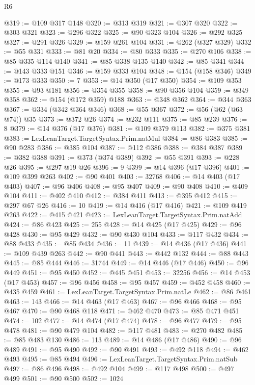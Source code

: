 \begin{lexlean}{R6}
\begin{coremodule}
@319 := @109 @317 @148
@320 := @313 @319
@321 := @307 @320
@322 := @303 @321
@323 := @296 @322
@325 := @90 @323 @104
@326 := @292 @325
@327 := @291 @326
@329 := @159 @261 @104
@331 := @262 (@327 @329)
@332 := @55 @331
@333 := @81 @20
@334 := @80 @333
@335 := @270 @106
@338 := @85 @335 @114 @140
@341 := @85 @338 @135 @140
@342 := @85 @341
@344 := @143 @333 @151
@346 := @159 @333 @104
@348 := @154 (@158 @346)
@349 := @173 @333
@350 := 7
@353 := @14 @350 (@17 @350)
@354 := @109 @353
@355 := @93 @181
@356 := @354 @355
@358 := @90 @356 @104
@359 := @349 @358
@362 := @154 (@172 @359) @188
@363 := @348 @362
@364 := @344 @363
@367 := @334 (@342 @364 @346)
@368 := @55 @367
@372 := @56 (@62 (@63 @74)) @35
@373 := @372 @26
@374 := @232 @111
@375 := @85 @239
@376 := 8
@379 := @14 @376 (@17 @376)
@381 := @109 @379 @113
@382 := @375 @381
@383 := LexLeanTarget.TargetSyntax.Prim.natMul
@384 := @86 @383
@385 := @90 @283
@386 := @385 @104
@387 := @112 @386
@388 := @384 @387
@389 := @382 @388
@391 := @373 (@374 @389)
@392 := @55 @391
@393 := @228 @26
@395 := @297 @19 @26
@396 := 9
@399 := @14 @396 (@17 @396)
@401 := @109 @399 @263
@402 := @90 @401
@403 := 32768
@406 := @14 @403 (@17 @403)
@407 := @96 @406
@408 := @95 @407
@409 := @90 @408
@410 := @409 @104
@411 := @402 @410
@412 := @384 @411
@413 := @395 @412
@415 := @297 @67 @26
@416 := 10
@419 := @14 @416 (@17 @416)
@421 := @109 @419 @263
@422 := @415 @421
@423 := LexLeanTarget.TargetSyntax.Prim.natAdd
@424 := @86 @423
@425 := 255
@428 := @14 @425 (@17 @425)
@429 := @96 @428
@430 := @95 @429
@432 := @90 @430 @104
@433 := @117 @432
@434 := @88 @433
@435 := @85 @434
@436 := 11
@439 := @14 @436 (@17 @436)
@441 := @109 @439 @263
@442 := @90 @441
@443 := @442 @132
@444 := @88 @443
@445 := @85 @444
@446 := 31744
@449 := @14 @446 (@17 @446)
@450 := @96 @449
@451 := @95 @450
@452 := @445 @451
@453 := 32256
@456 := @14 @453 (@17 @453)
@457 := @96 @456
@458 := @95 @457
@459 := @452 @458
@460 := @435 @459
@461 := LexLeanTarget.TargetSyntax.Prim.natLe
@462 := @86 @461
@463 := 143
@466 := @14 @463 (@17 @463)
@467 := @96 @466
@468 := @95 @467
@470 := @90 @468 @118
@471 := @462 @470
@473 := @85 @471 @451
@474 := 102
@477 := @14 @474 (@17 @474)
@478 := @96 @477
@479 := @95 @478
@481 := @90 @479 @104
@482 := @117 @481
@483 := @270 @482
@485 := @85 @483 @130
@486 := 113
@489 := @14 @486 (@17 @486)
@490 := @96 @489
@491 := @95 @490
@492 := @90 @491
@493 := @492 @118
@494 := @462 @493
@495 := @85 @494
@496 := LexLeanTarget.TargetSyntax.Prim.natSub
@497 := @86 @496
@498 := @492 @104
@499 := @117 @498
@500 := @497 @499
@501 := @90 @500
@502 := 1024

\end{coremodule}
\end{lexlean}
